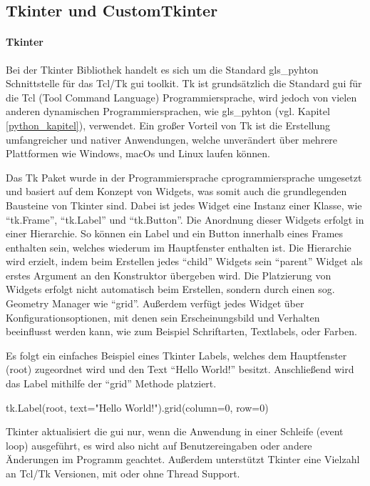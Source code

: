 \subsection{Tkinter und CustomTkinter}\label{tkinter_kapitel}
\paragraph{Tkinter}
Bei der Tkinter Bibliothek handelt es sich um die Standard \gls{gls_pyhton} Schnittstelle für das Tcl/Tk \ac{gui} toolkit. Tk ist grundsätzlich die Standard \acs{gui} für die Tcl (Tool Command Language) Programmiersprache, wird jedoch von vielen anderen dynamischen Programmiersprachen, wie \zB \gls{gls_pyhton} (vgl. Kapitel \ref{python_kapitel}), verwendet. Ein großer Vorteil von Tk ist die Erstellung umfangreicher und nativer Anwendungen, welche unverändert über mehrere Plattformen wie Windows, macOs und Linux laufen können. \cite[vgl.][]{Python_Software_Foundation_Tk:o.J., Tcl_Developer_Xchange:o.J.}

Das Tk Paket wurde in der Programmiersprache \gls{cprogrammiersprache} umgesetzt und basiert auf dem Konzept von Widgets, was somit auch die grundlegenden Bausteine von Tkinter sind. Dabei ist jedes Widget eine Instanz einer Klasse, wie \zB \enquote{tk.Frame}, \enquote{tk.Label} und \enquote{tk.Button}. Die Anordnung dieser Widgets erfolgt in einer Hierarchie. So können \zB ein Label und ein Button innerhalb eines Frames enthalten sein, welches wiederum im Hauptfenster enthalten ist. Die Hierarchie wird erzielt, indem beim Erstellen jedes \enquote{child} Widgets sein \enquote{parent} Widget als erstes Argument an den Konstruktor übergeben wird. Die Platzierung von Widgets erfolgt nicht automatisch beim Erstellen, sondern durch einen sog. Geometry Manager wie \enquote{grid}. Außerdem verfügt jedes Widget über Konfigurationsoptionen, mit denen sein Erscheinungsbild und Verhalten beeinflusst werden kann, wie zum Beispiel Schriftarten, Textlabels, oder Farben. \cite[vgl.][]{Python_Software_Foundation_Tk:o.J., Shipman:2013}

Es folgt ein einfaches Beispiel eines Tkinter Labels, welches dem Hauptfenster (root) zugeordnet wird und den Text \enquote{Hello World!} besitzt. Anschließend wird das Label mithilfe der \enquote{grid} Methode platziert. 
\begin{pythoncode}
tk.Label(root, text="Hello World!").grid(column=0, row=0)
\end{pythoncode}

Tkinter aktualisiert die \acs{gui} nur, wenn die Anwendung in einer Schleife (event loop) ausgeführt, es wird also nicht auf Benutzereingaben oder andere Änderungen im Programm geachtet. Außerdem unterstützt Tkinter eine Vielzahl an Tcl/Tk Versionen, mit oder ohne Thread Support. \cite[vgl.][]{Python_Software_Foundation_Tk:o.J.}

